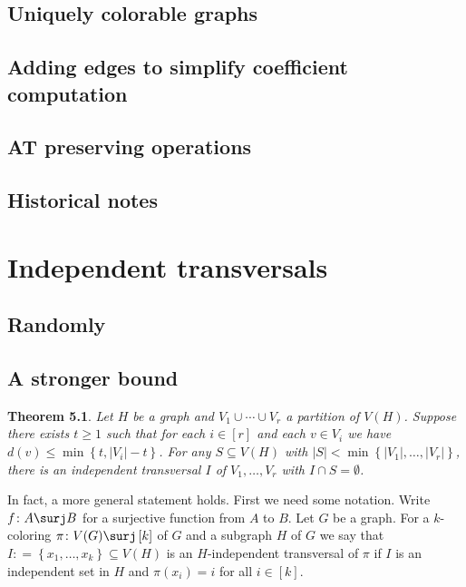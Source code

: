 \documentclass{tufte-book} %
\theoremstyle{plain}
\newtheorem{theorem}{Theorem}
\newcommand{\set}[1]{\left\{ #1 \right\}}
\newcommand{\card}[1]{\left|#1\right|}
\newcommand{\funcsurj}[3]{#1\colon #2 \surj #3}
\newcommand{\irange}[1]{\left[#1\right]}
\newcommand{\DefinedAs}{\mathrel{\mathop:}=}
\begin{document}
\section{Uniquely colorable graphs}
\section{Adding edges to simplify coefficient computation}
\section{AT preserving operations}
\section{Historical notes}

\chapter{Independent transversals}

\section{Randomly}
\section{A stronger bound}
\begin{theorem}\label{LopsidedTransversal}
Let $H$ be a graph and $V_1 \cup \cdots \cup V_r$ a partition of $V(H)$.  
Suppose there exists $t \geq 1$ such that for each $i \in \irange{r}$ and each $v \in V_i$ we have $d(v) \leq \min\set{t, \card{V_i}-t}$.  For any $S \subseteq V(H)$ with $\card{S} < \min\set{\card{V_1}, \ldots, \card{V_r}}$, there is an independent transversal $I$ of $V_1, \ldots, V_r$ with $I \cap S = \emptyset$.
\end{theorem}

In fact, a more general statement holds. 
First we need some notation. 
Write $\funcsurj{f}{A}{B}$ for a surjective function from $A$ to $B$.  
Let $G$ be a graph.  
For a $k$-coloring $\funcsurj{\pi}{V(G)}{\irange{k}}$ of $G$ and a subgraph $H$ of $G$ we say 
that $I \DefinedAs \set{x_1, \ldots, x_k} \subseteq V(H)$ is an $H$-independent transversal of $\pi$ if $I$ is an independent 
set in $H$ and $\pi(x_i) = i$ for all $i \in \irange{k}$.
\end{document}
